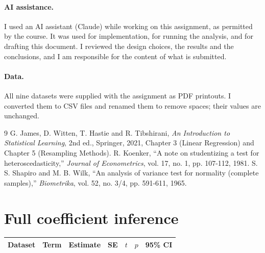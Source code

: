 \documentclass[11pt]{article}
\begin{document}
\paragraph{AI assistance.} I used an AI assistant (Claude) while working on this assignment, as permitted by the course. It was used for implementation, for running the analysis, and for drafting this document. I reviewed the design choices, the results and the conclusions, and I am responsible for the content of what is submitted.

\paragraph{Data.} All nine datasets were supplied with the assignment as PDF printouts. I converted them to CSV files and renamed them to remove spaces; their values are unchanged.

\begin{thebibliography}{9}
 G. James, D. Witten, T. Hastie and R. Tibshirani, \emph{An Introduction to Statistical Learning}, 2nd ed., Springer, 2021, Chapter 3 (Linear Regression) and Chapter 5 (Resampling Methods).
 R. Koenker, ``A note on studentizing a test for heteroscedasticity,'' \emph{Journal of Econometrics}, vol. 17, no. 1, pp. 107-112, 1981.
 S. S. Shapiro and M. B. Wilk, ``An analysis of variance test for normality (complete samples),'' \emph{Biometrika}, vol. 52, no. 3/4, pp. 591-611, 1965.
\end{thebibliography}

\appendix
\section{Full coefficient inference}
\label{app:coef}
\begin{table}[H]\centering\small
\begin{tabular}{llccccc}
\toprule
Dataset & Term & Estimate & SE & $t$ & $p$ & 95\% CI\\
\midrule

\bottomrule
\end{tabular}
\end{table}
\end{document}
